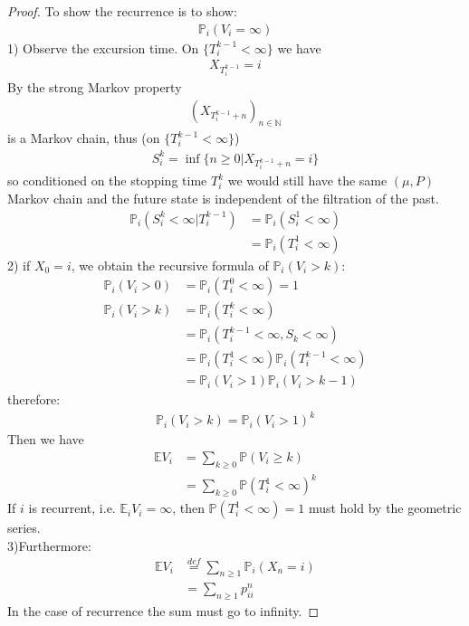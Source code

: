 \begin{proof}
	To show the recurrence is to show:
	\begin{align*}
		\mathbb{P}_i(V_i = \infty)
	\end{align*}
	1) Observe the excursion time. On $\{T_i^{k -1} < \infty\}$ we have 
	\begin{align*}
		X_{T_i^{k-1}} = i
	\end{align*}
	By the strong Markov property
	\begin{align*}
		(X_{T_i^{k-1} + n})_{n \in \mathbb{N}}
	\end{align*}
	is a Markov chain, thus (on $\{T_i^{k-1} < \infty \}$)
	\begin{align*}
		S_i^k = \inf \{n \geq 0| X_{T_i^{k-1} + n} = i\}
	\end{align*}
	so conditioned on the stopping time $T_i^k$ we would still have the same $(\mu, P)$ Markov chain and the future state is independent of the filtration of the past.
	\begin{align*}
		\mathbb{P}_i(S_i^k < \infty | T_i^{k-1}) & = \mathbb{P}_i(S_i^1 < \infty)\\
		&= \mathbb{P}_i(T_i^1 < \infty)
	\end{align*}
	2)
	if $X_0= i$, we obtain the recursive formula of $\mathbb{P}_i(V_i > k)$:
	\begin{align*}
		\mathbb{P}_i(V_i > 0) &= \mathbb{P}_i(T_i^0 < \infty ) = 1\\
		\mathbb{P}_i(V_i > k) &= \mathbb{P}_i(T_i^k < \infty)\\
		&= \mathbb{P}_i(T_i^{k-1} < \infty, S_k < \infty)\\
		&= \mathbb{P}_i(T_i^1 < \infty) \mathbb{P}_i(T_i^{k-1} < \infty)\\
		&= \mathbb{P}_i(V_i > 1)	\mathbb{P}_i(V_i > k-1)
\end{align*}
therefore:
\begin{align*}
	\mathbb{P}_i(V_i > k) = \mathbb{P}_i(V_i > 1)^k
\end{align*}
Then we have
	\begin{align*}
		\mathbb{E}V_i &= \sum_{k \geq 0} \mathbb{P}(V_i \geq k)\\
		&= \sum_{k \geq 0} \mathbb{P}(T_i^1< \infty)^k  
	\end{align*}
If $i$ is recurrent, i.e. $\mathbb{E}_iV_i = \infty$, then $\mathbb{P}(T_i^1 < \infty) = 1 $ must hold by the geometric series.\\
3)Furthermore:
	\begin{align*}
		\mathbb{E} V_i &\overset{def}{=} \sum_{n \geq 1} \mathbb{P}_i(X_n = i)\\
		&= \sum_{n \geq 1} p_{ii}^n 
	\end{align*}
	In the case of recurrence the sum must go to infinity.
\end{proof}
